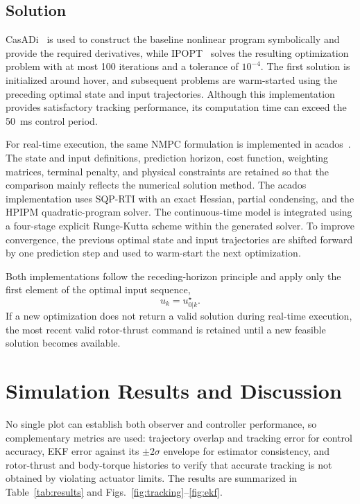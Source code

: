 \documentclass[conference]{IEEEtran}
\begin{document}
\subsection{Solution}

CasADi~\cite{andersson2019casadi} is used to construct the baseline nonlinear program symbolically and provide the required derivatives, while IPOPT~\cite{wachter2006ipopt} solves the resulting optimization problem with at most 100 iterations and a tolerance of $10^{-4}$. The first solution is initialized around hover, and subsequent problems are warm-started using the preceding optimal state and input trajectories. Although this implementation provides satisfactory tracking performance, its computation time can exceed the \SI{50}{ms} control period.

For real-time execution, the same NMPC formulation is implemented in acados~\cite{verschueren2022acados}. The state and input definitions, prediction horizon, cost function, weighting matrices, terminal penalty, and physical constraints are retained so that the comparison mainly reflects the numerical solution method. The acados implementation uses SQP-RTI with an exact Hessian, partial condensing, and the HPIPM quadratic-program solver. The continuous-time model is integrated using a four-stage explicit Runge-Kutta scheme within the generated solver. To improve convergence, the previous optimal state and input trajectories are shifted forward by one prediction step and used to warm-start the next optimization.

Both implementations follow the receding-horizon principle and apply only the first element of the optimal input sequence,
\begin{equation}
u_k=u_{0|k}^{\star}.
\end{equation}
If a new optimization does not return a valid solution during real-time execution, the most recent valid rotor-thrust command is retained until a new feasible solution becomes available.

\section{Simulation Results and Discussion}
\label{sec:discussion}
No single plot can establish both observer and controller performance, so complementary metrics are used: trajectory overlap and tracking error for control accuracy, EKF error against its $\pm2\sigma$ envelope for estimator consistency, and rotor-thrust and body-torque histories to verify that accurate tracking is not obtained by violating actuator limits. The results are summarized in Table~\ref{tab:results} and Figs.~\ref{fig:tracking}--\ref{fig:ekf}.
\end{document}

